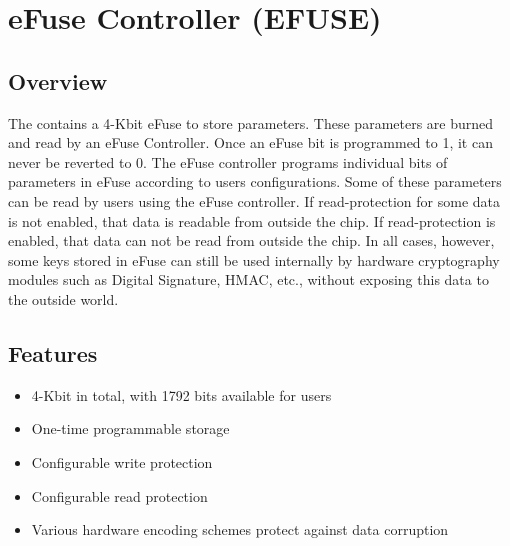 \documentclass[main\_\_EN.tex]{subfiles}
\begin{document}

\ifglobal
\else
    {\let\clearpage\relax \listoftodos}
    \tableofcontents
\fi



\hypertarget{efuse}{}
\chapter{eFuse Controller (EFUSE)}
\label{mod:efuse}

\section{Overview}

The \chipname{} contains a 4-Kbit eFuse to store parameters. These parameters are burned and read by an eFuse Controller. Once an eFuse bit is programmed to 1, it can never be reverted to 0. The eFuse controller programs individual bits of parameters in eFuse according to users configurations. Some of these parameters can be read by users using the eFuse controller. If read-protection for some data is not enabled, that data is readable from outside the chip. If read-protection is enabled, that data can not be read from outside the chip. In all cases, however, some keys stored in eFuse can still be used internally by hardware cryptography modules such as Digital Signature, HMAC, etc., without exposing this data to the outside world.

\section{Features}

\begin{itemize}
    \item 4-Kbit in total, with 1792 bits available for users
    \item One-time programmable storage
    \item Configurable write protection
    \item Configurable read protection
    \item Various hardware encoding schemes protect against data corruption
\end{itemize}
\end{document}
